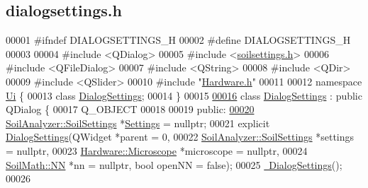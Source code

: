 \hypertarget{dialogsettings_8h_source}{}\subsection{dialogsettings.\+h}
\label{dialogsettings_8h_source}

\begin{DoxyCode}
00001 \textcolor{preprocessor}{#ifndef DIALOGSETTINGS\_H}
00002 \textcolor{preprocessor}{#define DIALOGSETTINGS\_H}
00003 
00004 \textcolor{preprocessor}{#include <QDialog>}
00005 \textcolor{preprocessor}{#include <\hyperlink{soilsettings_8h}{soilsettings.h}>}
00006 \textcolor{preprocessor}{#include <QFileDialog>}
00007 \textcolor{preprocessor}{#include <QString>}
00008 \textcolor{preprocessor}{#include <QDir>}
00009 \textcolor{preprocessor}{#include <QSlider>}
00010 \textcolor{preprocessor}{#include "\hyperlink{_hardware_8h}{Hardware.h}"}
00011 
00012 \textcolor{keyword}{namespace }\hyperlink{namespace_ui}{Ui} \{
00013 \textcolor{keyword}{class }\hyperlink{class_dialog_settings}{DialogSettings};
00014 \}
00015 
\hypertarget{dialogsettings_8h_source_l00016}{}\hyperlink{class_dialog_settings}{00016} \textcolor{keyword}{class }\hyperlink{class_dialog_settings}{DialogSettings} : \textcolor{keyword}{public} QDialog \{
00017   Q\_OBJECT
00018 
00019 \textcolor{keyword}{public}:
\hypertarget{dialogsettings_8h_source_l00020}{}\hyperlink{class_dialog_settings_ae6b9e42f9108f93c4964be28a7171648}{00020}   \hyperlink{class_soil_analyzer_1_1_soil_settings}{SoilAnalyzer::SoilSettings} *\hyperlink{class_dialog_settings_ae6b9e42f9108f93c4964be28a7171648}{Settings} = \textcolor{keyword}{nullptr};
00021   \textcolor{keyword}{explicit} \hyperlink{class_dialog_settings_a891cd177b754ee9249567759998ff47a}{DialogSettings}(QWidget *parent = 0,
00022                           \hyperlink{class_soil_analyzer_1_1_soil_settings}{SoilAnalyzer::SoilSettings} *settings = \textcolor{keyword}{nullptr},
00023                           \hyperlink{class_hardware_1_1_microscope}{Hardware::Microscope} *microscope = \textcolor{keyword}{nullptr},
00024                           \hyperlink{class_soil_math_1_1_n_n}{SoilMath::NN} *nn = \textcolor{keyword}{nullptr}, \textcolor{keywordtype}{bool} openNN = \textcolor{keyword}{false});
00025   \hyperlink{class_dialog_settings_a10e028cc22f2ab2367f582242fd8115e}{~DialogSettings}();
00026 

\end{DoxyCode}

